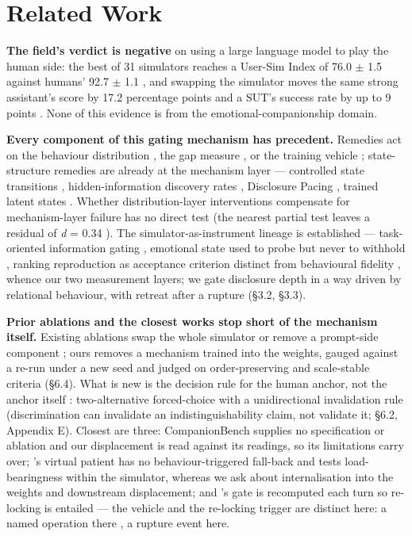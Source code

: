 \documentclass[letterpaper]{article}
\begin{document}
\section{Related Work}

\textbf{The field's verdict is negative} on using a large language model to play the human side: the best of 31 simulators reaches a User-Sim Index of 76.0 $\pm$ 1.5 against humans' 92.7 $\pm$ 1.1 \citep{sim2real}, and swapping the simulator moves the same strong assistant's score by 17.2 percentage points \citep{userlm} and a SUT's success rate by up to 9 points \citep{lostinsim}. None of this evidence is from the emotional-companionship domain.

\textbf{Every component of this gating mechanism has precedent.} Remedies act on the behaviour distribution \citep{ppol}, the gap measure \citep{sim2real}, or the training vehicle \citep{userlm}; state-structure remedies are already at the mechanism layer --- controlled state transitions \citep{miconsistent}, hidden-information discovery rates \citep{aisp}, Disclosure Pacing \citep{patientact}, trained latent states \citep{humanlm}. Whether distribution-layer interventions compensate for mechanism-layer failure has no direct test (the nearest partial test leaves a residual of \textit{d} = 0.34 \citep{walkaway}). The simulator-as-instrument lineage is established \citep{balogzhai} --- task-oriented information gating \citep{schatzmann2009}, emotional state used to probe but never to withhold \citep{emous}, ranking reproduction as acceptance criterion \citep{zhangbalog2020, simulatorarena} distinct from behavioural fidelity \citep{simevalir}, whence our two measurement layers; we gate disclosure depth in a way driven by relational behaviour, with retreat after a rupture (\S{}3.2, \S{}3.3).

\textbf{Prior ablations and the closest works stop short of the mechanism itself.} Existing ablations swap the whole simulator \citep{pare} or remove a prompt-side component \citep{simulatorarena}; ours removes a mechanism trained into the weights, gauged against a re-run under a new seed \citep{variance} and judged on order-preserving and scale-stable criteria (\S{}6.4). What is new is the decision rule for the human anchor, not the anchor itself \citep{jonesbergen, ppol}: two-alternative forced-choice with a unidirectional invalidation rule (discrimination can invalidate an indistinguishability claim, not validate it; \S{}6.2, Appendix E). Closest are three: CompanionBench \citep{companionbench} supplies no specification or ablation and our displacement is read against its readings, so its limitations carry over; \citet{avp}'s virtual patient has no behaviour-triggered fall-back and tests load-bearingness within the simulator, whereas we ask about internalisation into the weights and downstream displacement; and \citet{patientact}'s gate is recomputed each turn so re-locking is entailed --- the vehicle and the re-locking trigger are distinct here: a named operation there \citep{douself}, a rupture event here.
\end{document}
